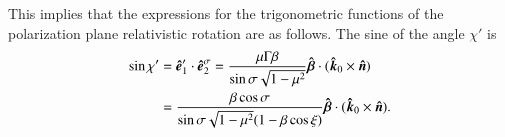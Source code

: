 \documentclass{aa}
\newcommand{\be}{\begin{equation}}
\newcommand{\ee}{\end{equation}}
\newcommand{\unit}[1]{\mbox{\boldmath $\hat{#1}$}}
\begin{document}
This implies that the expressions for the trigonometric functions of the polarization plane relativistic rotation are as follows. 
The sine of the angle $\chi'$ is
\begin{align}\label{eq:sinchi}
\sin{\chi'}&=\unit{e}_1'\cdot \unit{e}_2^{\sigma} =
\frac{\mu\Gamma\beta}{\sin{\sigma}\sqrt{1-\mu^2} } \unit{\beta} \cdot(\unit{k}_0 \times \unit{n}) \nonumber
\\
&=\frac{\beta\cos\sigma }{\sin{\sigma}\sqrt{1-\mu^2}  (1-\beta\cos\xi)} \unit{\beta} \cdot(\unit{k}_0 \times \unit{n}).
\end{align}
			

\end{document}
